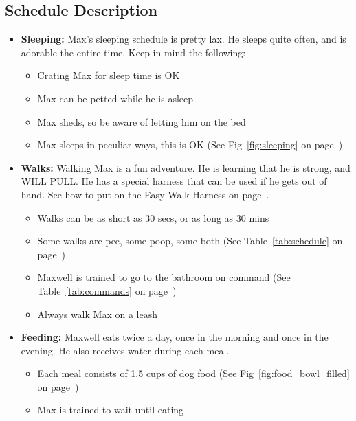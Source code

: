 \documentclass[pdftex,12pt]{article}
\begin{document}
\pagebreak

\subsection{Schedule Description}
\begin{itemize}\label{itm:schedule}
    \item \textbf{Sleeping:} Max's sleeping schedule is pretty lax. He sleeps 
        quite often, and is adorable the entire time. Keep in mind the following:
        \begin{itemize}
            \item Crating Max for sleep time is OK
            \item Max can be petted while he is asleep
            \item Max sheds, so be aware of letting him on the bed
            \item Max sleeps in peculiar ways, this is OK
                (See Fig~\ref{fig:sleeping} on page~\pageref{fig:sleeping})
        \end{itemize}
    \item \textbf{Walks:} Walking Max is a fun adventure. He is learning that he
        is strong, and WILL PULL. He has a special harness that can be used if he 
        gets out of hand. See how to put on the Easy Walk Harness on
        page~\pageref{itm:how_to_harness}.
        \begin{itemize}
            \item Walks can be as short as 30 secs, or as long as 30 mins
            \item Some walks are pee, some poop, some both
                (See Table~\ref{tab:schedule} on page~\pageref{tab:schedule})
            \item Maxwell is trained to go to the bathroom on command
                (See Table~\ref{tab:commands} on page~\pageref{tab:commands})
            \item Always walk Max on a leash
        \end{itemize}
    \item \textbf{Feeding:} Maxwell eats twice a day, once in the morning and
        once in the evening. He also receives water during each meal.
        \begin{itemize}
            \item Each meal consists of 1.5 cups of dog food
                (See Fig~\ref{fig:food_bowl_filled} on
                page~\pageref{fig:food_bowl_filled})
            \item Max is trained to wait until eating

\end{itemize}
\end{itemize}
\end{document}
